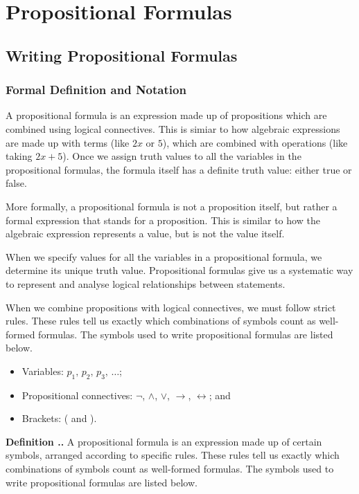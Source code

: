 \documentclass[a4paper, twoside]{article}
\newcounter{definitioncounter}
\renewcommand{\thedefinitioncounter}{\romannumeral\value{definitioncounter}}
\newcommand{\defcs}{\thesection.\refstepcounter{definitioncounter}\thedefinitioncounter}
\newcommand{\textdef}[1]{\hspace{0.2cm}\fontsize{11}{5}\selectfont\textbf{#1}\normalsize}
\newcommand{\rarrow}{\rightarrow}
\newcommand{\ioi}{\longleftrightarrow}
\begin{document}
\section{Propositional Formulas}

\subsection{Writing Propositional Formulas}
\subsubsection{Formal Definition and Notation}

A propositional formula is an expression made up of propositions which are combined using logical connectives. This is simiar to how algebraic expressions are made up with terms (like \(2x\) or \(5\)), which are combined with operations (like taking \(2x + 5\)). Once we assign truth values to all the variables in the propositional formulas, the formula itself has a definite truth value: either true or false.

More formally, a propositional formula is not a proposition itself, but rather a formal expression that stands for a proposition. This is similar to how the algebraic expression represents a value, but is not the value itself.

When we specify values for all the variables in a propositional formula, we determine its unique truth value. Propositional formulas give us a systematic way to represent and analyse logical relationships between statements.

When we combine propositions with logical connectives, we must follow strict rules. These rules tell us exactly which combinations of symbols count as well-formed formulas. The symbols used to write propositional formulas are listed below.

\begin{itemize}
    \item Variables: \(p_1, \, p_2, \, p_3, \, \ldots\);
    \item Propositional connectives: \(\neg\), \(\land\), \(\lor\), \(\rarrow\), \(\ioi\); and
    \item Brackets: ( and ).
\end{itemize}

\textdef{Definition \defcs.}
A propositional formula is an expression made up of certain symbols, arranged according to specific rules. These rules tell us exactly which combinations of symbols count as well-formed formulas. The symbols used to write propositional formulas are listed below.
\end{document}
